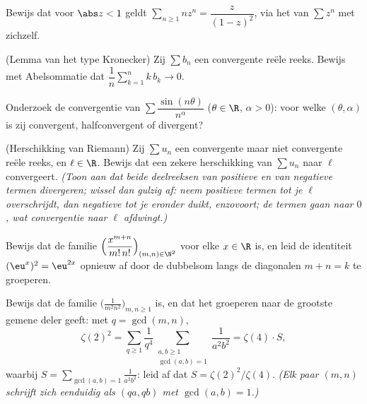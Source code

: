 \begin{exercise}[$\star$]\label{exo:b2:series:2}
Bewijs dat voor $\abs z < 1$ geldt $\sum_{n\geq1} n z^{n} =
\dfrac{z}{(1-z)^2}$, via het  van $\sum z^n$ met
zichzelf.
\end{exercise}

\begin{exercise}[$\star\star$]\label{exo:b2:series:3}
(Lemma van het type Kronecker) Zij $\sum b_n$ een convergente reële
reeks. Bewijs met Abelsommatie dat $\dfrac{1}{n}\sum_{k=1}^{n}
k\,b_k \to 0$.
\end{exercise}

\begin{exercise}[$\star\star$]\label{exo:b2:series:4}
Onderzoek de convergentie van $\sum \dfrac{\sin(n\theta)}{n^\alpha}$
($\theta \in \R$, $\alpha > 0$): voor welke $(\theta, \alpha)$ is
zij  convergent, halfconvergent of divergent?
\end{exercise}

\begin{exercise}[$\star\star\star$]\label{exo:b2:series:5}
(Herschikking van Riemann) Zij $\sum u_n$ een convergente maar niet
 convergente reële reeks, en $\ell \in \R$. Bewijs dat een
zekere herschikking van $\sum u_n$ naar $\ell$ convergeert.
\emph{(Toon aan dat beide deelreeksen van positieve en van
negatieve termen divergeren; wissel dan gulzig af: neem positieve
termen tot je $\ell$ overschrijdt, dan negatieve tot je eronder
duikt, enzovoort; de termen gaan naar $0$, wat convergentie naar
$\ell$ afdwingt.)}
\end{exercise}

\begin{exercise}[$\star\star$]\label{exo:b2:series:6}
Bewijs dat de familie
$\Bigl(\dfrac{x^{m+n}}{m!\,n!}\Bigr)_{(m,n)\in\N^2}$ voor elke $x
\in \R$  is, en leid de identiteit $(\eu^x)^2 =
\eu^{2x}$ opnieuw af door de dubbelsom langs de diagonalen $m + n =
k$ te groeperen.
\end{exercise}

\begin{exercise}[$\star\star$]\label{exo:b2:series:7}
Bewijs dat de familie $\bigl(\frac{1}{m^2 n^2}\bigr)_{m,n \geq 1}$
 is, en dat het groeperen naar de grootste gemene deler
geeft: met $q = \gcd(m,n)$,
\[
\zeta(2)^2 = \sum_{q\geq1} \frac{1}{q^4}
\sum_{\substack{a,b \geq 1\\ \gcd(a,b)=1}} \frac{1}{a^2b^2}
= \zeta(4) \cdot S,
\]
waarbij $S = \sum_{\gcd(a,b)=1} \frac{1}{a^2b^2}$: leid af dat $S =
\zeta(2)^2/\zeta(4)$. \emph{(Elk paar $(m,n)$ schrijft zich
eenduidig als $(qa, qb)$ met $\gcd(a,b) = 1$.)}
\end{exercise}

